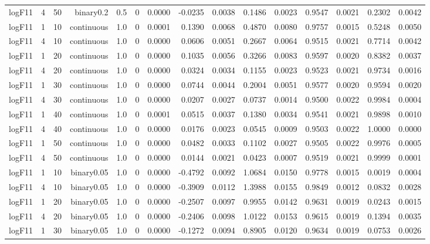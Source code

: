 \begin{longtable}{rrrrrrrrrrrrrrr}
  logF11 & 4 & 50 & binary0.2 & 0.5 & 0 & 0.0000 & -0.0235 & 0.0038 & 0.1486 & 0.0023 & 0.9547 & 0.0021 & 0.2302 & 0.0042 \\ 
  logF11 & 1 & 10 & continuous & 1.0 & 0 & 0.0001 & 0.1390 & 0.0068 & 0.4870 & 0.0080 & 0.9757 & 0.0015 & 0.5248 & 0.0050 \\ 
  logF11 & 4 & 10 & continuous & 1.0 & 0 & 0.0000 & 0.0606 & 0.0051 & 0.2667 & 0.0064 & 0.9515 & 0.0021 & 0.7714 & 0.0042 \\ 
  logF11 & 1 & 20 & continuous & 1.0 & 0 & 0.0000 & 0.1035 & 0.0056 & 0.3266 & 0.0083 & 0.9597 & 0.0020 & 0.8382 & 0.0037 \\ 
  logF11 & 4 & 20 & continuous & 1.0 & 0 & 0.0000 & 0.0324 & 0.0034 & 0.1155 & 0.0023 & 0.9523 & 0.0021 & 0.9734 & 0.0016 \\ 
  logF11 & 1 & 30 & continuous & 1.0 & 0 & 0.0000 & 0.0744 & 0.0044 & 0.2004 & 0.0051 & 0.9577 & 0.0020 & 0.9594 & 0.0020 \\ 
  logF11 & 4 & 30 & continuous & 1.0 & 0 & 0.0000 & 0.0207 & 0.0027 & 0.0737 & 0.0014 & 0.9500 & 0.0022 & 0.9984 & 0.0004 \\ 
  logF11 & 1 & 40 & continuous & 1.0 & 0 & 0.0001 & 0.0515 & 0.0037 & 0.1380 & 0.0034 & 0.9541 & 0.0021 & 0.9898 & 0.0010 \\ 
  logF11 & 4 & 40 & continuous & 1.0 & 0 & 0.0000 & 0.0176 & 0.0023 & 0.0545 & 0.0009 & 0.9503 & 0.0022 & 1.0000 & 0.0000 \\ 
  logF11 & 1 & 50 & continuous & 1.0 & 0 & 0.0000 & 0.0482 & 0.0033 & 0.1102 & 0.0027 & 0.9505 & 0.0022 & 0.9976 & 0.0005 \\ 
  logF11 & 4 & 50 & continuous & 1.0 & 0 & 0.0000 & 0.0144 & 0.0021 & 0.0423 & 0.0007 & 0.9519 & 0.0021 & 0.9999 & 0.0001 \\ 
  logF11 & 1 & 10 & binary0.05 & 1.0 & 0 & 0.0000 & -0.4792 & 0.0092 & 1.0684 & 0.0150 & 0.9778 & 0.0015 & 0.0019 & 0.0004 \\ 
  logF11 & 4 & 10 & binary0.05 & 1.0 & 0 & 0.0000 & -0.3909 & 0.0112 & 1.3988 & 0.0155 & 0.9849 & 0.0012 & 0.0832 & 0.0028 \\ 
  logF11 & 1 & 20 & binary0.05 & 1.0 & 0 & 0.0000 & -0.2507 & 0.0097 & 0.9955 & 0.0142 & 0.9631 & 0.0019 & 0.0243 & 0.0015 \\ 
  logF11 & 4 & 20 & binary0.05 & 1.0 & 0 & 0.0000 & -0.2406 & 0.0098 & 1.0122 & 0.0153 & 0.9615 & 0.0019 & 0.1394 & 0.0035 \\ 
  logF11 & 1 & 30 & binary0.05 & 1.0 & 0 & 0.0000 & -0.1272 & 0.0094 & 0.8905 & 0.0120 & 0.9634 & 0.0019 & 0.0753 & 0.0026 \\ 

\end{longtable}
